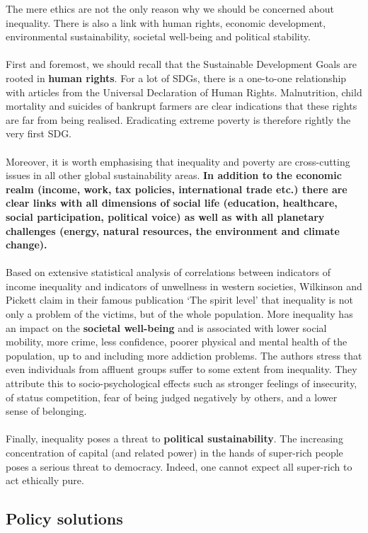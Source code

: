 \documentclass[../summary.tex]{subfiles}
\begin{document}
	The mere ethics are not the only reason why we should be concerned about inequality. There is also a link with human rights, economic development, environmental sustainability, societal well-being and political stability.
	\\\\
	First and foremost, we should recall that the Sustainable Development Goals are rooted in \textbf{human rights}. For a lot of SDGs, there is a one-to-one relationship with articles from the Universal Declaration of Human Rights. Malnutrition, child mortality and suicides of bankrupt farmers are clear indications that these rights are far from being realised. Eradicating extreme poverty is therefore rightly the very first SDG.
	\\\\
	Moreover, it is worth emphasising that inequality and poverty are cross-cutting issues in all other global sustainability areas. \textbf{In addition to the economic realm (income, work, tax policies, international trade etc.) there are clear links with all dimensions of social life (education, healthcare, social participation, political voice) as well as with all planetary challenges (energy, natural resources, the environment and climate change).}
	\\\\
	Based on extensive statistical analysis of correlations between indicators of income inequality and indicators of unwellness in western societies, Wilkinson and Pickett claim in their famous publication ‘The spirit level’ that inequality is not only a problem of the victims, but of the whole population. More inequality has an impact on the \textbf{societal well-being} and is associated with lower social mobility, more crime, less confidence, poorer physical and mental health of the population, up to and including more addiction problems. The authors stress that even individuals from affluent groups suffer to some extent from inequality. They attribute this to socio-psychological effects such as stronger feelings of insecurity, of status competition, fear of being judged negatively by others, and a lower sense of belonging.
	\\\\
	Finally, inequality poses a threat to \textbf{political sustainability}. The increasing concentration of capital (and related power) in the hands of super-rich people poses a serious threat to democracy. Indeed, one cannot expect all super-rich to act ethically pure.
	
	\subsection{Policy solutions}
	
\end{document}
